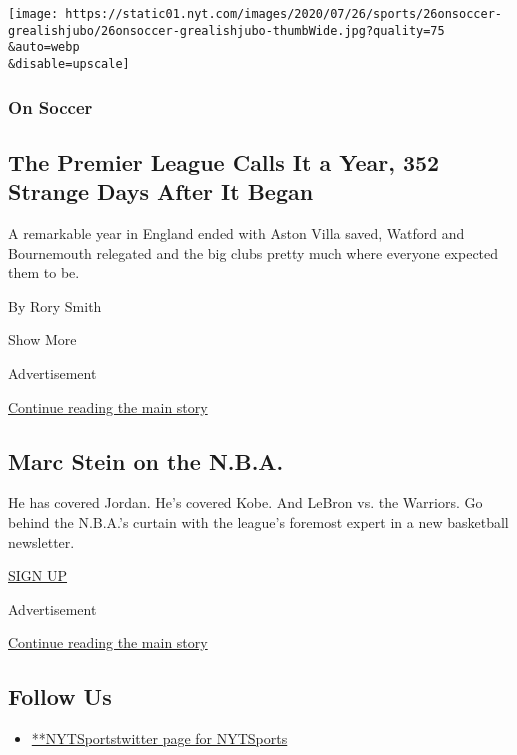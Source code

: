 \begin{enumerate}
  \texttt{[image: https://static01.nyt.com/images/2020/07/26/sports/26onsoccer-grealishjubo/26onsoccer-grealishjubo-thumbWide.jpg?quality=75\\\&auto=webp\\\&disable=upscale]}

  \hypertarget{on-soccer}{%
  \subsubsection{On Soccer}\label{on-soccer}}

  \hypertarget{the-premier-league-calls-it-a-year-352-strange-days-after-it-began}{%
  \subsection{The Premier League Calls It a Year, 352 Strange Days After
  It
  Began}\label{the-premier-league-calls-it-a-year-352-strange-days-after-it-began}}

  A remarkable year in England ended with Aston Villa saved, Watford and
  Bournemouth relegated and the big clubs pretty much where everyone
  expected them to be.

  By Rory Smith
\end{enumerate}

Show More

Advertisement

\protect\hyperlink{after-mid2}{Continue reading the main story}

\hypertarget{marc-stein-on-the-nba}{%
\subsection{Marc Stein on the N.B.A.}\label{marc-stein-on-the-nba}}

He has covered Jordan. He's covered Kobe. And LeBron vs. the Warriors.
Go behind the N.B.A.'s curtain with the league's foremost expert in a
new basketball newsletter.

\href{/newsletters/signup/MSB}{SIGN UP}

Advertisement

\protect\hyperlink{after-mktg}{Continue reading the main story}

\hypertarget{follow-us}{%
\subsection{Follow Us}\label{follow-us}}

\begin{itemize}
\tightlist
\item
  \href{https://twitter.com/NYTSports}{**NYTSportstwitter page for
  NYTSports}
\end{itemize}

